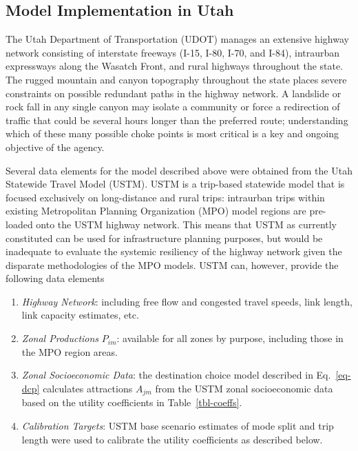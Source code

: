 \documentclass[]{ascelike-new}
\providecommand{\tightlist}{%
  \setlength{\itemsep}{0pt}\setlength{\parskip}{0pt}}\usepackage{longtable,booktabs,array}
\begin{document}
\subsection{Model Implementation in
Utah}\label{model-implementation-in-utah}

The Utah Department of Transportation (UDOT) manages an extensive
highway network consisting of interstate freeways (I-15, I-80, I-70, and
I-84), intraurban expressways along the Wasatch Front, and rural
highways throughout the state. The rugged mountain and canyon topography
throughout the state places severe constraints on possible redundant
paths in the highway network. A landslide or rock fall in any single
canyon may isolate a community or force a redirection of traffic that
could be several hours longer than the preferred route; understanding
which of these many possible choke points is most critical is a key and
ongoing objective of the agency.

Several data elements for the model described above were obtained from
the Utah Statewide Travel Model (USTM). USTM is a trip-based statewide
model that is focused exclusively on long-distance and rural trips:
intraurban trips within existing Metropolitan Planning Organization
(MPO) model regions are pre-loaded onto the USTM highway network. This
means that USTM as currently constituted can be used for infrastructure
planning purposes, but would be inadequate to evaluate the systemic
resiliency of the highway network given the disparate methodologies of
the MPO models. USTM can, however, provide the following data elements

\begin{enumerate}
\def\labelenumi{\arabic{enumi}.}
\tightlist
\item
  \emph{Highway Network}: including free flow and congested travel
  speeds, link length, link capacity estimates, etc.
\item
  \emph{Zonal Productions} \(P_{im}\): available for all zones by
  purpose, including those in the MPO region areas.
\item
  \emph{Zonal Socioeconomic Data}: the destination choice model
  described in Eq.~\ref{eq-dcp} calculates attractions \(A_{jm}\) from
  the USTM zonal socioeconomic data based on the utility coefficients in
  Table~\ref{tbl-coeffs}.
\item
  \emph{Calibration Targets}: USTM base scenario estimates of mode split
  and trip length were used to calibrate the utility coefficients as
  described below.
\end{enumerate}
\end{document}
